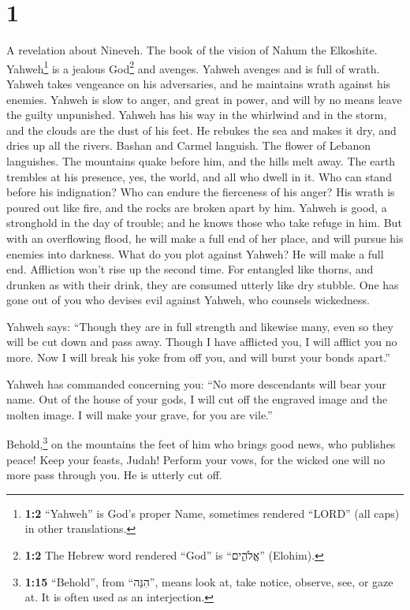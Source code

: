 \hypertarget{section}{%
\section{1}\label{section}}

 A revelation about Nineveh. The book of the vision of
Nahum the Elkoshite.  Yahweh\footnote{\textbf{1:2}
  ``Yahweh'' is God's proper Name, sometimes rendered ``LORD'' (all
  caps) in other translations.} is a jealous God\footnote{\textbf{1:2}
  The Hebrew word rendered ``God'' is ``אֱלֹהִ֑ים'' (Elohim).} and
avenges. Yahweh avenges and is full of wrath. Yahweh takes vengeance on
his adversaries, and he maintains wrath against his enemies.
 Yahweh is slow to anger, and great in power, and will by
no means leave the guilty unpunished. Yahweh has his way in the
whirlwind and in the storm, and the clouds are the dust of his feet.
 He rebukes the sea and makes it dry, and dries up all the
rivers. Bashan and Carmel languish. The flower of Lebanon languishes.
 The mountains quake before him, and the hills melt away.
The earth trembles at his presence, yes, the world, and all who dwell in
it.  Who can stand before his indignation? Who can endure
the fierceness of his anger? His wrath is poured out like fire, and the
rocks are broken apart by him.  Yahweh is good, a
stronghold in the day of trouble; and he knows those who take refuge in
him.  But with an overflowing flood, he will make a full
end of her place, and will pursue his enemies into darkness.
 What do you plot against Yahweh? He will make a full end.
Affliction won't rise up the second time.  For entangled
like thorns, and drunken as with their drink, they are consumed utterly
like dry stubble.  One has gone out of you who devises
evil against Yahweh, who counsels wickedness.

 Yahweh says: ``Though they are in full strength and
likewise many, even so they will be cut down and pass away. Though I
have afflicted you, I will afflict you no more.  Now I
will break his yoke from off you, and will burst your bonds apart.''

 Yahweh has commanded concerning you: ``No more
descendants will bear your name. Out of the house of your gods, I will
cut off the engraved image and the molten image. I will make your grave,
for you are vile.''

 Behold,\footnote{\textbf{1:15} ``Behold'', from
  ``הִנֵּה'', means look at, take notice, observe, see, or gaze at. It
  is often used as an interjection.} on the mountains the feet of him
who brings good news, who publishes peace! Keep your feasts, Judah!
Perform your vows, for the wicked one will no more pass through you. He
is utterly cut off.

